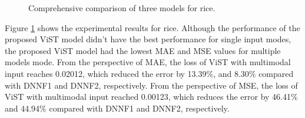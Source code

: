 \documentclass[acmsmall,manuscript, screen, review]{acmart}
\begin{document}
\begin{figure}[htbp]
\begin{minipage}{0.49\linewidth}
  \end{minipage}

  \caption{Comprehensive comparison of three models for rice. \label{comprehensive_rice}}
\end{figure}

Figure \ref{comprehensive_rice} shows the experimental results for rice.  Although the performance of the proposed ViST model didn't have the best performance for single input modes, the proposed ViST model had the lowest MAE and MSE values for multiple models mode. From the perspective of MAE, the loss of ViST with multimodal input reaches 0.02012, which reduced the error by 13.39\%, and 8.30\% compared with DNNF1 and DNNF2, respectively. From the perspective of MSE, the loss of ViST with multimodal input reached 0.00123, which reduces the error by 46.41\% and 44.94\% compared with DNNF1 and DNNF2, respectively. 
\end{document}
